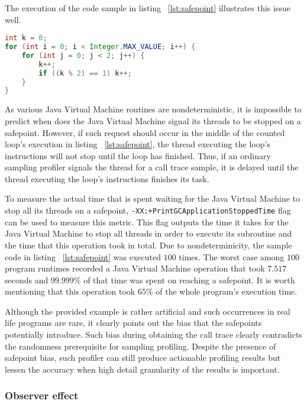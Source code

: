\documentclass[..thesis.tex]{subfiles}
\begin{document}
The execution of the code sample in listing ~\ref{lst:safepoint} illustrates this issue well. 


\begin{lstlisting}[language=java,style=def,label={lst:safepoint}, caption={Counted loops do not contain safepoints}]
int k = 0;
for (int i = 0; i < Integer.MAX_VALUE; i++) {
	for (int j = 0; j < 2; j++) {
    	k++;
    	if ((k % 2) == 1) k++;
	}
}
\end{lstlisting}
As various Java Virtual Machine routines are nondeterministic, it is impossible to predict when does the Java Virtual Machine signal its threads to be stopped on a safepoint. However, if such request should occur in the middle of the counted loop's execution in listing ~\ref{lst:safepoint}, the thread executing the loop's instructions will not stop until the loop has finished. Thus, if an ordinary sampling profiler signals the thread for a call trace sample, it is delayed until the thread executing the loop's instructions finishes its task. \cite{wakart_psychosomatic_2015}

To measure the actual time that is spent waiting for the Java Virtual Machine to stop all its threads on a safepoint, \texttt{-XX:+PrintGCApplicationStoppedTime} flag can be used to measure this metric. This flag outputs the time it takes for the Java Virtual Machine to stop all threads in order to execute its subroutine and the time that this operation took in total. Due to nondeterminicity, the sample code in listing ~\ref{lst:safepoint} was executed $100$ times. The worst case among $100$ program runtimes recorded a Java Virtual Machine operation that took $7.517$ seconds and $99.999\%$ of that time was spent on reaching a safepoint. It is worth mentioning that this operation took $65\%$ of the whole program's execution time.

Although the provided example is rather artificial and such occurrences in real life programs are rare, it clearly points out the bias that the safepoints potentially introduce. Such bias during obtaining the call trace clearly contradicts the randomness prerequisite for sampling profiling. Despite the presence of safepoint bias, such profiler can still produce actionable profiling results but lessen the accuracy when high detail granularity of the results is important.

\subsubsection{Observer effect}
\end{document}
